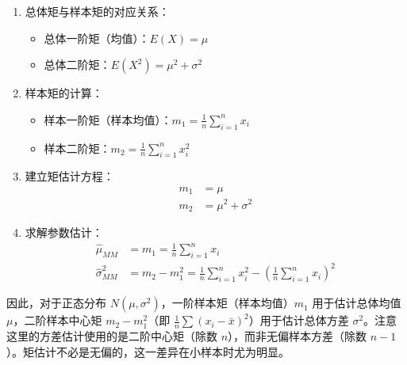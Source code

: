 \documentclass[
  twoside,12pt,fontset=none]{ctexbook}
\providecommand{\tightlist}{%
  \setlength{\itemsep}{0pt}\setlength{\parskip}{0pt}}
\begin{document}
\begin{enumerate}
\def\labelenumi{\arabic{enumi}.}
\item
  总体矩与样本矩的对应关系：

  \begin{itemize}
  \tightlist
  \item
    总体一阶矩（均值）：\(E(X) = \mu\)
  \item
    总体二阶矩：\(E(X^2) = \mu^2 + \sigma^2\)
  \end{itemize}
\item
  样本矩的计算：

  \begin{itemize}
  \tightlist
  \item
    样本一阶矩（样本均值）：\(m_1 = \frac{1}{n}\sum_{i=1}^{n} x_i\)
  \item
    样本二阶矩：\(m_2 = \frac{1}{n}\sum_{i=1}^{n} x_i^2\)
  \end{itemize}
\item
  建立矩估计方程：
  \begin{align*}
  m_1 &= \mu \\
  m_2 &= \mu^2 + \sigma^2
  \end{align*}
\item
  求解参数估计：
  \begin{align*}
  \hat{\mu}_{MM} &= m_1 = \frac{1}{n}\sum_{i=1}^{n} x_i \\
  \hat{\sigma}^2_{MM} &= m_2 - m_1^2 = \frac{1}{n}\sum_{i=1}^{n} x_i^2 - \left(\frac{1}{n}\sum_{i=1}^{n} x_i\right)^2
  \end{align*}
\end{enumerate}

因此，对于正态分布 \(N(\mu, \sigma^2)\)，一阶样本矩（样本均值）\(m_1\) 用于估计总体均值 \(\mu\)，二阶样本中心矩 \(m_2 - m_1^2\)（即 \(\frac{1}{n}\sum(x_i - \bar{x})^2\)）用于估计总体方差 \(\sigma^2\)。注意这里的方差估计使用的是二阶中心矩（除数 \(n\)），而非无偏样本方差（除数 \(n-1\)）。矩估计不必是无偏的，这一差异在小样本时尤为明显。
\end{document}
